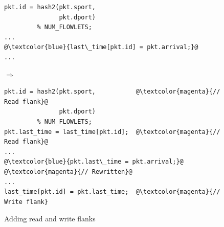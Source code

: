 \begin{figure}[!t]
  \begin{minipage}{0.43\textwidth}
  \begin{small}
  \begin{lstlisting}[style=customc, numbers=none, frame=none]
pkt.id = hash2(pkt.sport,
               pkt.dport)
         % NUM_FLOWLETS;
...
@\textcolor{blue}{last\_time[pkt.id] = pkt.arrival;}@
...
  \end{lstlisting}
  \end{small}
  \end{minipage}
%  
  \hspace{-0.5in}
  $\Longrightarrow$ 
  \hspace{-0.2in}
%  
  \begin{minipage}{0.61\textwidth}
  \begin{small}
  \begin{lstlisting}[style=customc, numbers=none, frame=none]
pkt.id = hash2(pkt.sport,           @\textcolor{magenta}{// Read flank}@
               pkt.dport)
         % NUM_FLOWLETS;
pkt.last_time = last_time[pkt.id];  @\textcolor{magenta}{// Read flank}@
...
@\textcolor{blue}{pkt.last\_time = pkt.arrival;}@             @\textcolor{magenta}{// Rewritten}@
...
last_time[pkt.id] = pkt.last_time;  @\textcolor{magenta}{// Write flank}
  \end{lstlisting}
  \end{small}
  \end{minipage}
  \caption{Adding read and write flanks}
\label{fig:stateful_flanks}
\end{figure}

